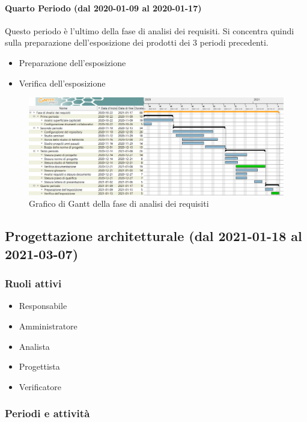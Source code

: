 \paragraph{Quarto Periodo (dal 2020-01-09 al 2020-01-17)}
Questo periodo è l'ultimo della fase di analisi dei requisiti. Si concentra quindi sulla preparazione dell'esposizione dei prodotti dei 3 periodi precedenti.
\begin{itemize}
	\item Preparazione dell'esposizione
	\item Verifica dell'esposizione
\end{itemize}


\begin{landscape}
	\begin{figure}[H]
		\centering
		\includegraphics[width=\linewidth]{res/images/ganttFase1.png}
		\caption{Grafico di Gantt della fase di analisi dei requisiti}
		\label{fig:Gantt Analisi dei requisiti}
	\end{figure}
\end{landscape}

\subsection{Progettazione architetturale (dal 2021-01-18 al 2021-03-07)}

\subsubsection{Ruoli attivi}
\begin{itemize}
	\item Responsabile
	\item Amministratore
	\item Analista
	\item Progettista
	\item Verificatore
\end{itemize}

\subsubsection{Periodi e attività}

